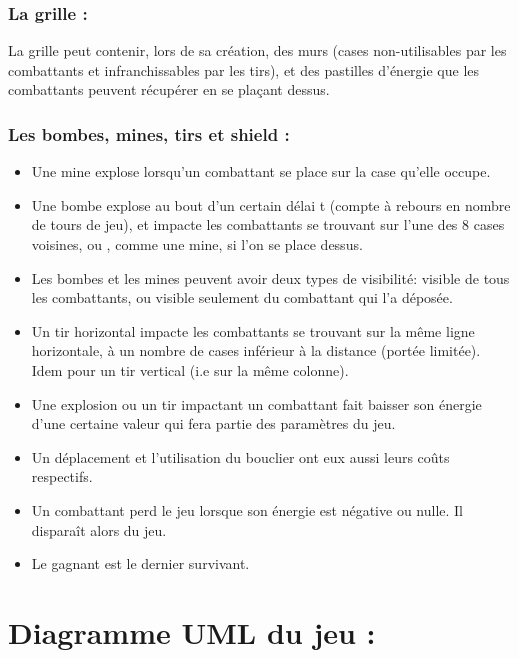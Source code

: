 \documentclass{article}
\begin{document}
\subsubsection{La grille :}

La grille peut contenir, lors de sa création, des murs (cases non-utilisables par les combattants et infranchissables par les tirs), et des pastilles d'énergie que les combattants peuvent récupérer en se plaçant dessus.

\vspace{1\baselineskip}

\subsubsection{Les bombes, mines, tirs et shield :}

\vspace{1\baselineskip}

\begin{itemize}
    \item Une mine explose lorsqu'un combattant se place sur la case qu'elle occupe.
    \item Une bombe explose au bout d'un certain délai t (compte à rebours en nombre de tours de jeu),
	et impacte les combattants se trouvant sur l'une des 8 cases voisines, ou , comme une mine,	si l'on se place dessus.
	\item Les bombes et les mines peuvent avoir deux types de visibilité: visible de tous les combattants, ou visible seulement du combattant qui l'a déposée.
	\item Un tir horizontal impacte les combattants se trouvant sur la même ligne horizontale, à un nombre de cases inférieur à la distance (portée limitée). Idem pour un tir vertical (i.e sur la même colonne).
	\item Une explosion ou un tir impactant un combattant fait baisser son énergie d'une certaine valeur qui fera partie des paramètres du jeu.
	\item Un déplacement et l'utilisation du bouclier ont eux aussi leurs coûts respectifs.
    \item Un combattant perd le jeu lorsque son énergie est négative ou nulle. Il disparaît alors du jeu.
    \item Le gagnant est le dernier survivant.
\end{itemize}

\vspace{1\baselineskip}

\section{Diagramme UML du jeu :}
\end{document}

